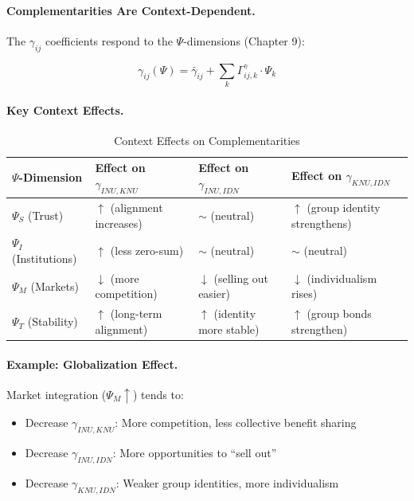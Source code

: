 \paragraph{Complementarities Are Context-Dependent.}
The $\gamma_{ij}$ coefficients respond to the $\Psi$-dimensions (Chapter 9):

\begin{tcolorbox}[colback=green!5!white, colframe=green!50!black]
\begin{equation}
\boxed{
\gamma_{ij}(\Psi) = \bar{\gamma}_{ij} + \sum_k \Gamma^{\gamma}_{ij,k} \cdot \Psi_k
}
\label{eq:app-c-gamma-context}
\end{equation}
\end{tcolorbox}

\paragraph{Key Context Effects.}

\begin{table}[htbp]
\centering
\caption{Context Effects on Complementarities}
\label{tab:app-c-context-complementarities}
\renewcommand{\arraystretch}{1.3}
\begin{tabular}{@{}llll@{}}
\toprule
\textbf{$\Psi$-Dimension} & \textbf{Effect on $\gamma_{INU,KNU}$} & \textbf{Effect on $\gamma_{INU,IDN}$} & \textbf{Effect on $\gamma_{KNU,IDN}$} \\
\midrule
$\Psi_S$ (Trust) & $\uparrow$ (alignment increases) & $\sim$ (neutral) & $\uparrow$ (group identity strengthens) \\
$\Psi_I$ (Institutions) & $\uparrow$ (less zero-sum) & $\sim$ (neutral) & $\sim$ (neutral) \\
$\Psi_M$ (Markets) & $\downarrow$ (more competition) & $\downarrow$ (selling out easier) & $\downarrow$ (individualism rises) \\
$\Psi_T$ (Stability) & $\uparrow$ (long-term alignment) & $\uparrow$ (identity more stable) & $\uparrow$ (group bonds strengthen) \\
\bottomrule
\end{tabular}
\end{table}

\paragraph{Example: Globalization Effect.}
Market integration ($\Psi_M \uparrow$) tends to:
\begin{itemize}
\item Decrease $\gamma_{INU,KNU}$: More competition, less collective benefit sharing
\item Decrease $\gamma_{INU,IDN}$: More opportunities to ``sell out''
\item Decrease $\gamma_{KNU,IDN}$: Weaker group identities, more individualism
\end{itemize}

